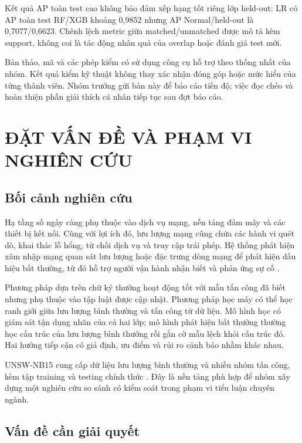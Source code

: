 \documentclass[12pt,a4paper,oneside]{report}
\begin{document}
Kết quả AP toàn test cao không bảo đảm xếp hạng tốt riêng lớp held-out: LR có AP toàn test RF/XGB khoảng 0,9852 nhưng AP Normal/held-out là 0,7077/0,6623. Chênh lệch metric giữa matched/unmatched được mô tả kèm support, không coi là tác động nhân quả của overlap hoặc đánh giá test mới.

Bản thảo, mã và các phép kiểm có sử dụng công cụ hỗ trợ theo thống nhất của nhóm. Kết quả kiểm kỹ thuật không thay xác nhận đóng góp hoặc mức hiểu của từng thành viên. Nhóm trưởng gửi bản này để báo cáo tiến độ; việc đọc chéo và hoàn thiện phần giải thích cá nhân tiếp tục sau đợt báo cáo.

\clearpage{}
\chapter{ĐẶT VẤN ĐỀ VÀ PHẠM VI NGHIÊN CỨU}

\section{Bối cảnh nghiên cứu}

Hạ tầng số ngày càng phụ thuộc vào dịch vụ mạng, nền tảng đám mây và các thiết bị kết nối. Cùng với lợi ích đó, lưu lượng mạng cũng chứa các hành vi quét dò, khai thác lỗ hổng, từ chối dịch vụ và truy cập trái phép. Hệ thống phát hiện xâm nhập mạng quan sát lưu lượng hoặc đặc trưng dòng mạng để phát hiện dấu hiệu bất thường, từ đó hỗ trợ người vận hành nhận biết và phản ứng sự cố \cite{nist80094}.

Phương pháp dựa trên chữ ký thường hoạt động tốt với mẫu tấn công đã biết nhưng phụ thuộc vào tập luật được cập nhật. Phương pháp học máy có thể học ranh giới giữa lưu lượng bình thường và tấn công từ dữ liệu. Mô hình học có giám sát tận dụng nhãn của cả hai lớp; mô hình phát hiện bất thường thường học cấu trúc của lưu lượng bình thường rồi gắn cờ mẫu lệch khỏi cấu trúc đó. Hai hướng tiếp cận có giả định, ưu điểm và rủi ro cảnh báo nhầm khác nhau.

UNSW-NB15 cung cấp dữ liệu lưu lượng bình thường và nhiều nhóm tấn công, kèm tập training và testing chính thức \cite{moustafa2015,moustafa2016,unswsite}. Đây là nền tảng phù hợp để nhóm xây dựng một nghiên cứu so sánh có kiểm soát trong phạm vi tiểu luận chuyên ngành.

\section{Vấn đề cần giải quyết}
\end{document}
